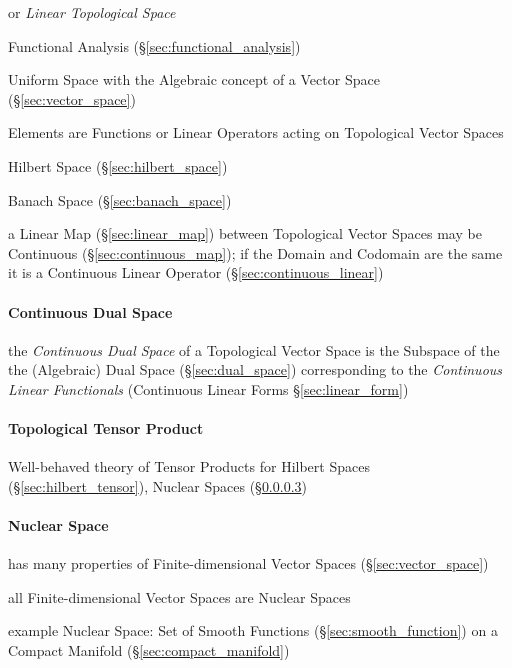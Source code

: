 or \emph{Linear Topological Space}

Functional Analysis (\S\ref{sec:functional_analysis})

Uniform Space with the Algebraic concept of a Vector Space
(\S\ref{sec:vector_space})

Elements are Functions or Linear Operators acting on Topological
Vector Spaces

Hilbert Space (\S\ref{sec:hilbert_space})

Banach Space (\S\ref{sec:banach_space})

a Linear Map (\S\ref{sec:linear_map}) between Topological Vector
Spaces may be Continuous (\S\ref{sec:continuous_map}); if the Domain
and Codomain are the same it is a Continuous Linear Operator
(\S\ref{sec:continuous_linear})



\paragraph{Continuous Dual Space}\label{sec:continuous_dual_space}
\hfill

the \emph{Continuous Dual Space} of a Topological Vector Space is the Subspace
of the the (Algebraic) Dual Space (\S\ref{sec:dual_space}) corresponding to the
\emph{Continuous Linear Functionals} (Continuous Linear Forms
\S\ref{sec:linear_form})



\paragraph{Topological Tensor Product}\label{sec:topological_tensor}
\hfill

Well-behaved theory of Tensor Products for Hilbert Spaces
(\S\ref{sec:hilbert_tensor}), Nuclear Spaces
(\S\ref{sec:nuclear_space})



\paragraph{Nuclear Space}\label{sec:nuclear_space}\hfill

has many properties of Finite-dimensional Vector Spaces
(\S\ref{sec:vector_space})

all Finite-dimensional Vector Spaces are Nuclear Spaces

example Nuclear Space: Set of Smooth Functions
(\S\ref{sec:smooth_function}) on a Compact Manifold
(\S\ref{sec:compact_manifold})



